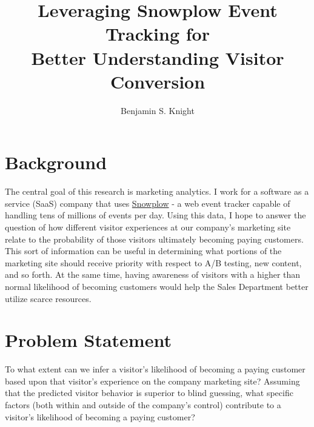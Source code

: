 \documentclass{article} %
\author{Benjamin S. Knight}
\title{%
Leveraging Snowplow Event Tracking for \\ Better Understanding Visitor Conversion}
\begin{document}
\maketitle
\section{Background}
\indent\indent The central goal of this research is marketing analytics. I work for a software as a service (SaaS) company that uses
\href{http://snowplowanalytics.com/}{Snowplow} - a web event tracker capable of handling tens of millions of events per day. Using this data, I hope to answer the question of how different visitor experiences at our company's marketing site relate to the probability of those visitors ultimately becoming paying customers. \\
\indent This sort of information can be useful in determining what portions of the marketing site should receive priority with respect to A/B testing, new content, and so forth. At the same time, having awareness of visitors with a higher than normal likelihood of becoming customers would help the Sales Department better utilize scarce resources.

\section{Problem Statement}
\indent\indent To what extent can we infer a visitor's likelihood of becoming a paying customer based upon that visitor's experience on the company marketing site? Assuming that the predicted visitor behavior is superior to blind guessing, what specific factors (both within and outside of the company's control) contribute to a visitor's likelihood of becoming a paying customer?
\end{document}
